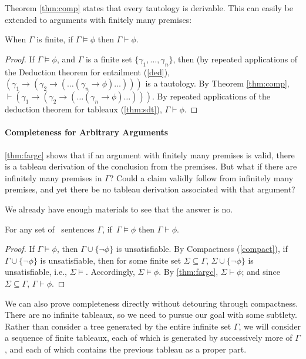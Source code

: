 Theorem \ref{thm:comp} states that every tautology is derivable. This can easily be extended to arguments with finitely many premises: \begin{theorem}\label{thm:fargc} When $\Gamma$ is finite, if\/ $\Gamma \vDash \phi$ then $\Gamma \vdash \phi$.	
\end{theorem}
\begin{proof}
	If $\Gamma \vDash \phi$, and $\Gamma$ is a finite set $\{\gamma_{1},\ldots,\gamma_{n}\}$, then (by repeated applications of the Deduction theorem for entailment (\autoref{ded}), $(\gamma_{1} \to (\gamma_{2} \to (\ldots(\gamma_{n} \to \phi)\ldots)))$ is a tautology. By Theorem \ref{thm:comp}, $\vdash (\gamma_{1} \to (\gamma_{2} \to (\ldots(\gamma_{n} \to \phi)\ldots)))$. By repeated applications of the deduction theorem for tableaux (\autoref{thm:sdt}), $\Gamma \vdash \phi$.
\end{proof}

\paragraph{Completeness for Arbitrary Arguments} \autoref{thm:fargc} shows that if an argument with finitely many premises is valid, there is a tableau derivation of the conclusion from the premises. But what if there are infinitely many premises in $\Gamma$? Could a claim validly follow from infinitely many premises, and yet there be no tableau derivation associated with that argument?

We already have enough materials to see that the answer is no.

\begin{theorem}
For any set of \lone\ sentences $\Gamma$, if\, $\Gamma\vDash \phi$ then $\Gamma\vdash\phi$.
\begin{proof}
	If $\Gamma\vDash\phi$, then $\Gamma\cup\{¬\phi\}$ is unsatisfiable. By Compactness (\autoref{compact}), if $\Gamma\cup\{¬\phi\}$ is unsatisfiable, then for some finite set $\Sigma\subseteq\Gamma$, $\Sigma\cup\{¬\phi\}$ is unsatisfiable, i.e., $\Sigma \vDash$. Accordingly, $\Sigma\vDash\phi$. By \autoref{thm:fargc}, $\Sigma\vdash \phi$; and since $\Sigma\subseteq \Gamma$, $\Gamma\vdash \phi$. 
\end{proof}
\end{theorem}


We can also prove completeness directly without detouring through compactness. There are no infinite tableaux, so we need to pursue our goal with some subtlety. Rather than consider a tree generated by
the entire infinite set $\Gamma$, we will consider a sequence of finite tableaux, each of which is generated by successively more of $\Gamma$, and each of which contains the previous tableau as a proper part.

